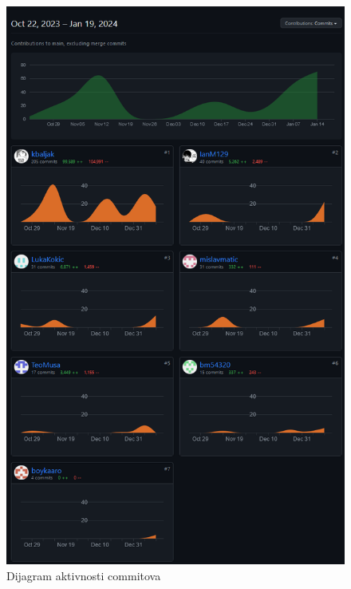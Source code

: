 		\begin{figure}[H]
			\includegraphics[width=\textwidth]{slike/activityfinal.png} %
			\caption{Dijagram aktivnosti commitova}
			\label{fig:Dijagram aktivnosti commitova} %
		\end{figure}
	